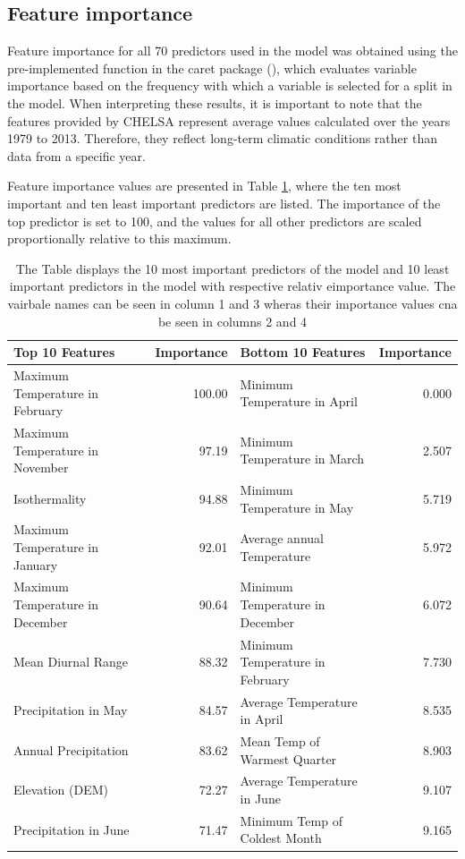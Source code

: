 \documentclass[
]{krantz}
\begin{document}
\subsection{Feature importance}\label{feature-importance}

Feature importance for all 70 predictors used in the model was obtained using the pre-implemented function in the caret package (\citet{kuhn2008}), which evaluates variable importance based on the frequency with which a variable is selected for a split in the model. When interpreting these results, it is important to note that the features provided by CHELSA represent average values calculated over the years 1979 to 2013. Therefore, they reflect long-term climatic conditions rather than data from a specific year.

Feature importance values are presented in Table \ref{tab:table3}, where the ten most important and ten least important predictors are listed. The importance of the top predictor is set to 100, and the values for all other predictors are scaled proportionally relative to this maximum.

\begin{table}

\caption{\label{tab:table3}The Table displays the 10 most important predictors of the model and 10 least important predictors in the model with respective relativ eimportance value. The vairbale names can be seen in column 1 and 3 wheras their importance values cna be seen in columns 2 and 4}
\centering
\begin{tabular}[t]{l|r|l|r}
\hline
Top 10 Features & Importance & Bottom 10 Features & Importance\\
\hline
Maximum Temperature in February & 100.00 & Minimum Temperature in April & 0.000\\
\hline
Maximum Temperature in November & 97.19 & Minimum Temperature in March & 2.507\\
\hline
Isothermality & 94.88 & Minimum Temperature in May & 5.719\\
\hline
Maximum Temperature in January & 92.01 & Average annual Temperature & 5.972\\
\hline
Maximum Temperature in December & 90.64 & Minimum Temperature in December & 6.072\\
\hline
Mean Diurnal Range & 88.32 & Minimum Temperature in February & 7.730\\
\hline
Precipitation in May & 84.57 & Average Temperature in April & 8.535\\
\hline
Annual Precipitation & 83.62 & Mean Temp of Warmest Quarter & 8.903\\
\hline
Elevation (DEM) & 72.27 & Average Temperature in June & 9.107\\
\hline
Precipitation in June & 71.47 & Minimum Temp of Coldest Month & 9.165\\
\hline
\end{tabular}
\end{table}
\end{document}

